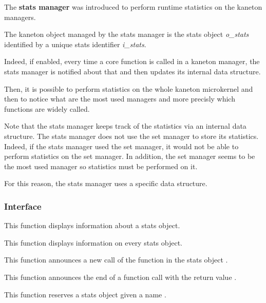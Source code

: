 The \textbf{stats manager} was introduced to perform runtime statistics on
the kaneton managers.

The kaneton object managed by the stats manager is the stats object
\textit{o\_stats} identified by a unique stats identifier \textit{i\_stats}.

Indeed, if enabled, every time a core function is called in a kaneton
manager, the stats manager is notified about that and then updates its
internal data structure.

Then, it is possible to perform statistics on the whole kaneton microkernel
and then to notice what are the most used managers and more precisly which
functions are widely called.

Note that the stats manager keeps track of the statistics via an internal
data structure. The stats manager does not use the set manager to store
its statistics. Indeed, if the stats manager used the set manager, it
would not be able to perform statistics on the set manager. In addition,
the set manager seems to be the most used manager so statistics must be
performed on it.

For this reason, the stats manager uses a specific data structure.

%
%

\subsubsection{Interface}

	 {
	   This function displays information about a stats object.
	 }

	 {
	   This function displays information on every stats object.
	 }

	 {
	   This function announces a new call of the function
	    in the stats object .
	 }

	 {
	   This function announces the end of a function call with the
	   return value .
	 }

	 {
	   This function reserves a stats object given a name .
	 }

